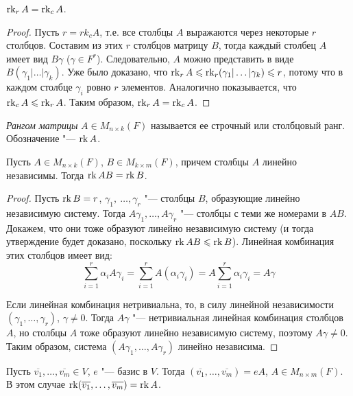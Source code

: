 \begin{theorem}
	$\operatorname{rk}_rA = \operatorname{rk}_cA$.
\end{theorem}

\begin{proof}
	Пусть $r = rk_cA$, т.\:е. все столбцы $A$ выражаются через некоторые $r$ столбцов. Составим из этих $r$ столбцов матрицу $B$, тогда каждый столбец $A$ имеет вид $B\gamma$ ($\gamma \in F^r$). Следовательно, $A$ можно представить в виде $B(\gamma_1|\dots|\gamma_k)$. Уже было доказано, что $\operatorname{rk}_rA \leqslant \operatorname{rk}_r(\gamma_1|\dots|\gamma_k) \leqslant r$, потому что в каждом столбце $\gamma_i$ ровно $r$ элементов. Аналогично показывается, что $\operatorname{rk}_cA \leqslant \operatorname{rk}_rA$. Таким образом, $\operatorname{rk}_rA = \operatorname{rk}_cA$.
\end{proof}

\begin{definition}
	\textit{Рангом матрицы} $A \in M_{n \times k}(F)$ называется ее строчный или столбцовый ранг. Обозначение "--- $\operatorname{rk}{A}$.
\end{definition}

\begin{proposition}
	Пусть $A \in M_{n \times k}(F)$, $B \in M_{k \times m}(F)$, причем столбцы $A$ линейно независимы. Тогда $\operatorname{rk}{AB} = \operatorname{rk}{B}$.
\end{proposition}

\begin{proof}
	Пусть $\operatorname{rk}{B} = r$, $\gamma_1,\ \dots, \gamma_r$ "--- столбцы $B$, образующие линейно независимую систему. Тогда $A\gamma_1, \dots, A\gamma_r$ "--- столбцы с теми же номерами в $AB$. Докажем, что они тоже образуют линейно независимую систему (и тогда утверждение будет доказано, поскольку $\operatorname{rk}{AB} \leqslant \operatorname{rk}{B}$). Линейная комбинация этих столбцов имеет вид:
	\[\sum_{i = 1}^{r}\alpha_iA\gamma_i = \sum_{i = 1}^{r}A(\alpha_i\gamma_i) = A\sum_{i = 1}^{r}\alpha_i\gamma_i = A\gamma\]
		
	Если линейная комбинация нетривиальна, то, в силу линейной независимости $(\gamma_1, \dots, \gamma_r)$, $\gamma \ne 0$. Тогда $A\gamma$ "--- нетривиальная линейная комбинация столбцов $A$, но столбцы $A$ тоже образуют линейно независимую систему, поэтому $A\gamma \ne 0$. Таким образом, система $(A\gamma_1, \dots, A\gamma_r)$ линейно независима.
\end{proof}

\begin{proposition}
	Пусть $\overline{v_1}, \dots, \overline{v_m} \in V$, $e$ "--- базис в $V$. Тогда $(\overline{v_1}, \dots, \overline{v_m}) = eA$, $A \in M_{n \times m}(F)$. В этом случае $\rk(\overline{v_1}, \dots, \overline{v_m}) \hm{=} \rk{A}$.
\end{proposition}


